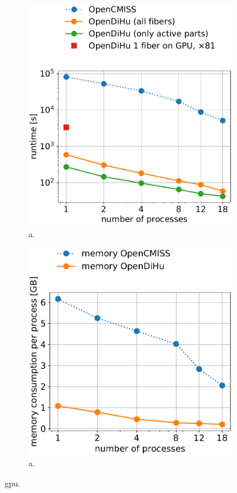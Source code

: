 \begin{figure}[H]
  \centering%
  \begin{subfigure}[t]{0.48\textwidth}%
    \centering%
    \includegraphics[width=\textwidth]{images/results/studies/0_weak_scaling_runtime.pdf}%
    \caption{a.}%
    \label{fig:16_hodgkin_huxley_cpu}%
  \end{subfigure}
  \quad
  \begin{subfigure}[t]{0.48\textwidth}%
    \centering%
    \includegraphics[width=\textwidth]{images/results/studies/0_weak_scaling_memory.pdf}%
    \caption{a.}%
    \label{fig:16_hodgkin_huxley_gpu}%
  \end{subfigure}   
  \caption{gpu.}%
  \label{fig:16_hodgkin_huxley_cpu_gpu}%
\end{figure}%

